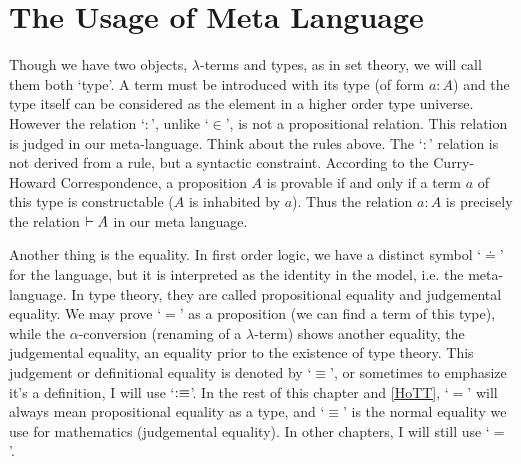 \section{The Usage of Meta Language}
Though we have two objects, $\lambda$-terms and types, as in set theory,
we will call them both `type'. A term must be introduced with its type
(of form $a:A$) 
and the type itself can be considered as the element in a higher order 
type universe. However the relation `$:$', unlike `$\in$', is not a 
propositional relation. This relation is judged in our meta-language. 
Think about the rules above. The `$:$' relation is not derived from a 
rule, but a syntactic constraint. According to the Curry-Howard 
Correspondence, a proposition $A$ is provable if and only if a term 
$a$ of this type is constructable ($A$ is inhabited by $a$). Thus the 
relation $a:A$ is precisely the relation $\vdash A$ in our meta language. 

Another thing is the equality. In first order logic, we have a distinct
symbol `$\doteq$' for the language, but it is interpreted as the identity
in the model, i.e. the meta-language. In type theory, they are called
propositional equality and judgemental equality. We may prove `$=$' as
a proposition (we can find a term of this type), while the 
$\alpha$-conversion (renaming of a $\lambda$-term) shows another equality,
the judgemental equality, an equality prior to the existence of type
theory. This judgement or definitional equality is denoted by `$\equiv$',
or sometimes to emphasize it's a definition, I will use `$:\equiv$'. In 
the rest of this chapter and \autoref{HoTT}, `$=$' will always mean
propositional equality as a type, and `$\equiv$' is the normal equality
we use for mathematics (judgemental equality). In other chapters, I will 
still use `$=$'. 

